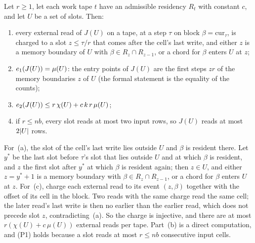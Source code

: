 \begin{lemma}[Charging]\label{lem:charging}
Let $r\ge1$, let each work tape $t$ have an admissible residency $R_t$ with constant $c$, and let
$U$ be a set of slots. Then:
\begin{enumerate}[label=(\alph*)]
\item every external read of $J(U)$ on a tape, at a step $\tau$ on block $\beta=\mathrm{cur}_\tau$,
is charged to a slot $z\le\tau/r$ that comes after the cell's last write, and either $z$ is a
memory boundary of $U$ with $\beta\in R_z\cap R_{z-1}$, or a chord for $\beta$ enters $U$ at $z$;
\item $e_1(J(U))=\mu(U)$: the entry points of $J(U)$ are the first steps $zr$ of the memory boundaries $z$
of $U$ (the formal statement is the equality of the counts);
\item $e_2(J(U))\le r\,\chi(U)+c\,k\,r\,\mu(U)$;
\item[(P1)] if $r\le nb$, every slot reads at most two input rows, so $J(U)$ reads at most
$2\lvert U \rvert$ rows.
\end{enumerate}
\end{lemma}

\begin{outline}
For~(a), the slot of the cell's last write lies outside $U$ and $\beta$ is resident there. Let
$y^*$ be the last slot before $\tau$'s slot that lies outside $U$ and at which $\beta$ is
resident, and $z$ the first slot after $y^*$ at which $\beta$ is resident again; then $z\in U$,
and either $z=y^*+1$ is a memory boundary with $\beta\in R_z\cap R_{z-1}$, or a chord for $\beta$
enters $U$ at $z$. For~(c), charge each external read to its event $(z,\beta)$ together with the
offset of its cell in the block. Two reads with the same charge read the same cell; the later
read's last write is then no earlier than the earlier read, which does not precede slot $z$,
contradicting~(a). So the charge is injective, and there are at most $r(\chi(U)+c\,\mu(U))$ external reads per tape. Part~(b) is a
direct computation, and (P1) holds because a slot reads at most $r\le nb$ consecutive input
cells.
\end{outline}

